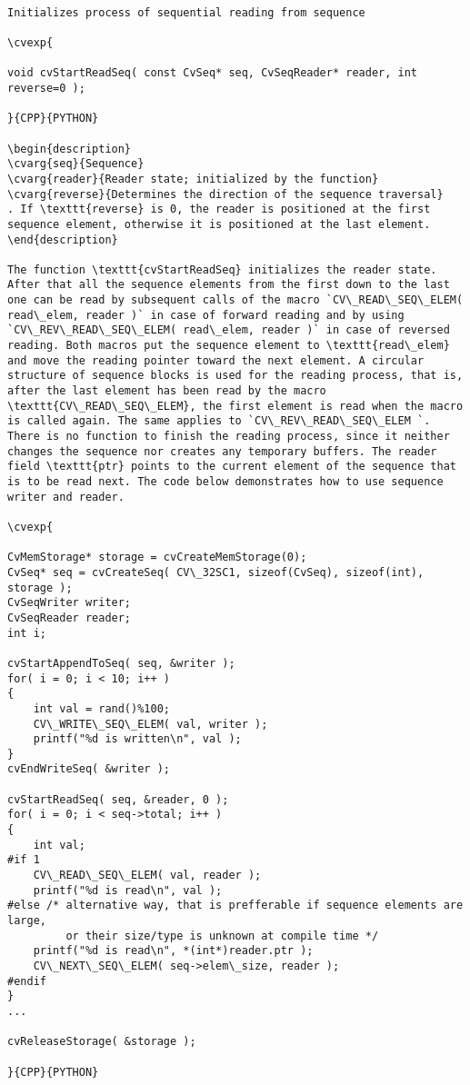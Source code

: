 \begin{verbatim}

Initializes process of sequential reading from sequence

\cvexp{

void cvStartReadSeq( const CvSeq* seq, CvSeqReader* reader, int reverse=0 );

}{CPP}{PYTHON}

\begin{description}
\cvarg{seq}{Sequence}
\cvarg{reader}{Reader state; initialized by the function}
\cvarg{reverse}{Determines the direction of the sequence traversal}
. If \texttt{reverse} is 0, the reader is positioned at the first sequence element, otherwise it is positioned at the last element.
\end{description}

The function \texttt{cvStartReadSeq} initializes the reader state. After that all the sequence elements from the first down to the last one can be read by subsequent calls of the macro `CV\_READ\_SEQ\_ELEM( read\_elem, reader )` in case of forward reading and by using `CV\_REV\_READ\_SEQ\_ELEM( read\_elem, reader )` in case of reversed reading. Both macros put the sequence element to \texttt{read\_elem} and move the reading pointer toward the next element. A circular structure of sequence blocks is used for the reading process, that is, after the last element has been read by the macro \texttt{CV\_READ\_SEQ\_ELEM}, the first element is read when the macro is called again. The same applies to `CV\_REV\_READ\_SEQ\_ELEM `. There is no function to finish the reading process, since it neither changes the sequence nor creates any temporary buffers. The reader field \texttt{ptr} points to the current element of the sequence that is to be read next. The code below demonstrates how to use sequence writer and reader.

\cvexp{

CvMemStorage* storage = cvCreateMemStorage(0);
CvSeq* seq = cvCreateSeq( CV\_32SC1, sizeof(CvSeq), sizeof(int), storage );
CvSeqWriter writer;
CvSeqReader reader;
int i;

cvStartAppendToSeq( seq, &writer );
for( i = 0; i < 10; i++ )
{
    int val = rand()%100;
    CV\_WRITE\_SEQ\_ELEM( val, writer );
    printf("%d is written\n", val );
}
cvEndWriteSeq( &writer );

cvStartReadSeq( seq, &reader, 0 );
for( i = 0; i < seq->total; i++ )
{
    int val;
#if 1
    CV\_READ\_SEQ\_ELEM( val, reader );
    printf("%d is read\n", val );
#else /* alternative way, that is prefferable if sequence elements are large,
         or their size/type is unknown at compile time */
    printf("%d is read\n", *(int*)reader.ptr );
    CV\_NEXT\_SEQ\_ELEM( seq->elem\_size, reader );
#endif
}
...

cvReleaseStorage( &storage );

}{CPP}{PYTHON}


\end{verbatim}
